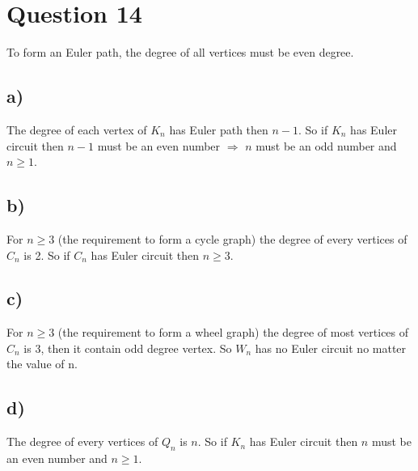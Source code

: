 \documentclass{article}
\begin{document}
\section*{Question 14}
To form an Euler path, the degree of all vertices must be even degree.\\
\subsection*{a)}
The degree of each vertex of $K_n$ has Euler path then $n - 1$. So if $K_n$ has Euler circuit then $n - 1$ must be an even number $\Rightarrow$ $n$ must be an odd number and $n \geqslant 1$.
\subsection*{b)}
For $n \geqslant 3$ (the requirement to form a cycle graph) the degree of every vertices of $C_n$ is 2. So if $C_n$ has Euler circuit then $n \geqslant 3$.
\subsection*{c)}
For $n \geqslant 3$ (the requirement to form a wheel graph) the degree of most vertices of $C_n$ is 3, then it contain odd degree vertex. So $W_n$ has no Euler circuit no matter the value of n.
\subsection*{d)}
The degree of every vertices of $Q_n$ is $n$. So if $K_n$ has Euler circuit then $n$ must be an even number and $n \geqslant 1$.
\end{document}

